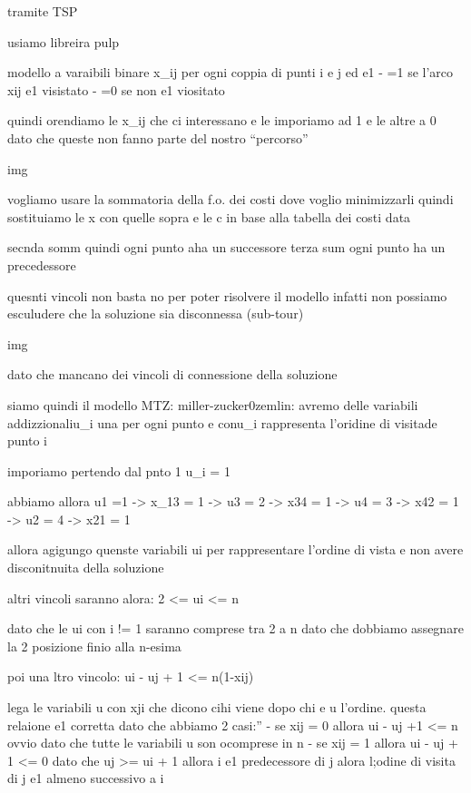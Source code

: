 tramite TSP

usiamo libreira pulp


modello a varaibili binare x_{ij} per ogni coppia di punti i e j ed e1 
- =1 se l’arco x{ij} e1 visistato
- =0 se non e1 viositato

quindi orendiamo le x_{ij} che ci interessano e le imporiamo ad 1 e le altre a 0 dato che queste non fanno parte del nostro “percorso”

img

vogliamo usare la sommatoria {della f.o. }dei costi  dove voglio minimizzarli quindi sostituiamo le x con quelle sopra e le c in base alla tabella dei costi data

secnda somm quindi ogni punto aha un successore
terza sum ogni punto ha un precedessore

quesnti vincoli non basta no per poter risolvere il modello infatti non possiamo esculudere che la soluzione sia disconnessa (sub-tour)


img


dato che mancano dei vincoli di connessione della soluzione


siamo quindi il modello MTZ: miller-zucker0zemlin:
avremo delle variabili addizzionaliu_i una per ogni punto e conu_i rappresenta l’oridine di visitade punto i

imporiamo pertendo dal pnto 1
u_i = 1

abbiamo allora u1 =1 -> x_13 = 1 -> u3 = 2 -> x34 = 1 -> u4 = 3 -> x42 = 1 -> u2 = 4 -> x21 = 1

allora agigungo quenste variabili ui per rappresentare l’ordine di vista e non avere disconitnuita della soluzione

altri vincoli saranno alora:
2 <= ui <= n

dato che le ui con i != 1 saranno comprese tra 2 a n dato che dobbiamo assegnare la 2 posizione finio alla n-esima

poi una ltro vincolo:
ui - uj + 1 <= n(1-xij)

lega le variabili u con xji che dicono cihi viene dopo chi e u l’ordine. questa relaione e1 corretta dato che abbiamo 2 casi:”
- se xij = 0 allora ui - uj +1 <= n ovvio dato che tutte le variabili u son ocomprese in n 
- se xij = 1 allora ui - uj + 1 <= 0 dato che uj >= ui + 1 allora i e1 predecessore di j  alora l;odine di visita di j e1 almeno successivo a i 